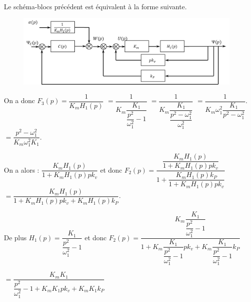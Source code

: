 \documentclass[10pt,fleqn]{article} %
\begin{document}
\ifprof
\begin{corrige}~\\
Le schéma-blocs précédent est équivalent à la forme suivante. 
\begin{figure}[H]
\centering
\includegraphics[width=0.7\linewidth]{cor_10}
\end{figure}

On a donc $F_3(p)=\dfrac{1}{K_mH_1(p)}$ $=\dfrac{1}{K_m\dfrac{K_1}{\dfrac{p^2}{\omega_1^2}-1}}$
 $=\dfrac{1}{K_m\dfrac{K_1}{\dfrac{p^2-\omega_1^2}{\omega_1^2}}}$
  $=\dfrac{1}{K_m\omega_1^2\dfrac{K_1}{p^2-\omega_1^2}}$.
    $=\dfrac{p^2-\omega_1^2}{K_m\omega_1^2K_1}$.

On a alors : $\dfrac{K_m H_1(p)}{1+K_m H_1(p)pk_v}$ et donc 
$F_2(p)=\dfrac{\dfrac{K_m H_1(p)}{1+K_m H_1(p)pk_v}}{1+\dfrac{K_m H_1(p)k_P}{1+K_m H_1(p)pk_v}}$
$= \dfrac{K_m H_1(p)}{1+K_m H_1(p)pk_v+K_m H_1(p)k_P}$.


De plus $H_1(p)=\dfrac{K_1}{\dfrac{p^2}{\omega_1^2}-1}$ et donc 
$F_2(p)= \dfrac{K_m \dfrac{K_1}{\dfrac{p^2}{\omega_1^2}-1}}{1+K_m \dfrac{K_1}{\dfrac{p^2}{\omega_1^2}-1}pk_v+K_m \dfrac{K_1}{\dfrac{p^2}{\omega_1^2}-1}k_P}$

$= \dfrac{K_m K_1}{\dfrac{p^2}{\omega_1^2}-1+K_m K_1pk_v+K_m K_1k_P}$

\end{corrige}
\else
\fi
\end{document}
